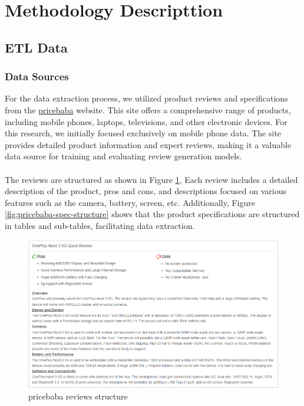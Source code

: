 \section{Methodology Descripttion}
\subsection{ETL Data}
\subsubsection{Data Sources}
For the data extraction process, we utilized product reviews and specifications from the \href{https://pricebaba.com/}{pricebaba} website. This site offers a comprehensive range of products, including mobile phones, laptops, televisions, and other electronic devices. For this research, we initially focused exclusively on mobile phone data. The site provides detailed product information and expert reviews, making it a valuable data source for training and evaluating review generation models.
\\\\
The reviews are structured as shown in Figure \ref{fig:pricebaba-review-structure}, Each review includes a detailed description of the product, pros and cons, and descriptions focused on various features such as the camera, battery, screen, etc. Additionally, Figure \ref{fig:pricebaba-spec-structure} shows that the product specifications are structured in tables and sub-tables, facilitating data extraction.
\begin{figure}[H]
    \centering
    \includegraphics[width=12cm]{images/pricebaba_review_structure.png}
    \caption{pricebaba reviews structure}
    \label{fig:pricebaba-review-structure}
\end{figure}
